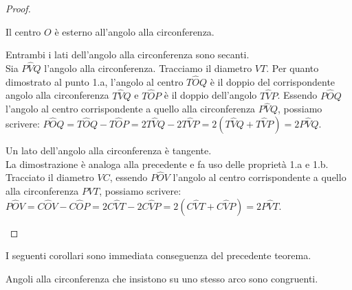 \begin{proof}
\begin{enumerate*}
\item Il centro $O$ è esterno all'angolo alla circonferenza.
\begin{enumerate*}
\noindent\begin{minipage}{0.6\textwidth}\parindent15pt
\item Entrambi i lati dell'angolo alla circonferenza sono secanti.\\
Sia $P\widehat{V}Q$ l'angolo alla circonferenza. Tracciamo il 
diametro $VT$. Per quanto dimostrato al punto 1.a, l'angolo al centro 
$T\widehat{O}Q$ è il doppio del corrispondente angolo alla 
circonferenza $T\widehat{V}Q$ e $T\widehat{O}P$ è il doppio 
dell'angolo $T\widehat{V}P$. Essendo $P\widehat{O}Q$ l'angolo al 
centro corrispondente a quello alla circonferenza $P\widehat{V}Q$, 
possiamo  scrivere: 
$P\widehat{O}Q=T\widehat{O}Q-T\widehat{O}P=2T\widehat{V}Q-2T\widehat{V
} P=2(T\widehat{V}Q+T\widehat{V}P)=2P\widehat{V}Q$.
\end{minipage}\hfil
\noindent\hspace{-20pt}\begin{minipage}{0.4\textwidth}
  \centering
\end{minipage}
\noindent\begin{minipage}{0.6\textwidth}\parindent15pt
\item Un lato dell'angolo alla circonferenza è tangente.\\
La dimostrazione è analoga alla precedente e fa uso delle proprietà 
1.a e 1.b. Tracciato il diametro $VC$, essendo $P\widehat{O}V$ 
l'angolo al centro corrispondente a quello alla circonferenza 
$P\widehat{V}T$, possiamo scrivere: 
$P\widehat{O}V=C\widehat{O}V-C\widehat{O}P=2C\widehat{V}T-2C\widehat{V
} P=2(C\widehat{V}T+C\widehat{V}P)=2P\widehat{V}T$.
\end{minipage}\hfil
\noindent\hspace{-20pt}\begin{minipage}{0.4\textwidth}
  \centering
\end{minipage}
\end{enumerate*}
\end{enumerate*}
\end{proof}

I seguenti corollari sono immediata conseguenza del precedente 
teorema.
\begin{corollario}
Angoli alla circonferenza che insistono su uno stesso arco sono 
congruenti.
\end{corollario}

